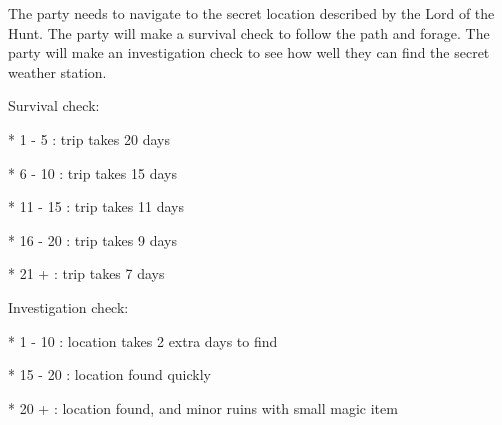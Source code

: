 The party needs to navigate to the secret location described by the Lord of the Hunt.
The party will make a survival check to follow the path and forage.
The party will make an investigation check to see how well they can find the secret weather station.

Survival check:

* 1 - 5   : trip takes 20 days

* 6 - 10  : trip takes 15 days

* 11 - 15 : trip takes 11 days

* 16 - 20 : trip takes 9 days

* 21 +    : trip takes 7 days


Investigation check:

* 1 - 10  : location takes 2 extra days to find

* 15 - 20 : location found quickly

* 20 +    : location found, and minor ruins with small magic item

